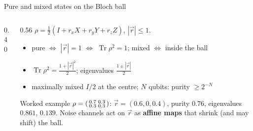 \documentclass[aspectratio=169,11pt]{beamer}
\newcommand{\key}[1]{{\color{qdark}\textbf{#1}}}
\begin{document}
\begin{frame}[label=fPure]{Pure and mixed states on the Bloch ball}
  \begin{columns}[T]
    \begin{column}{0.40\textwidth}
      \centering
    \end{column}
    \begin{column}{0.56\textwidth}
      \small
      $\rho = \frac12(I + r_xX + r_yY + r_zZ)$, $|\vec r| \le 1$.
      \begin{itemize}\itemsep1pt
        \item pure $\Leftrightarrow$ $|\vec r| = 1$ $\Leftrightarrow$ $\operatorname{Tr}\rho^2 = 1$; mixed $\Leftrightarrow$ inside the ball
        \item $\operatorname{Tr}\rho^2 = \frac{1 + |\vec r|^2}{2}$; eigenvalues $\frac{1 \pm |\vec r|}{2}$
        \item maximally mixed $I/2$ at the centre; $N$ qubits: purity $\ge 2^{-N}$
      \end{itemize}
      \begin{exampleblock}{Worked example}
        \scriptsize $\rho = \begin{psmallmatrix}0.7&0.3\\0.3&0.3\end{psmallmatrix}$: $\vec r = (0.6, 0, 0.4)$, purity $0.76$, eigenvalues $0.861$, $0.139$.
        Noise channels act on $\vec r$ as \key{affine maps} that shrink (and may shift) the ball.
      \end{exampleblock}
    \end{column}
  \end{columns}
\end{frame}
\end{document}
